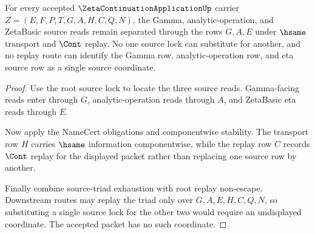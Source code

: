 \begin{theorem}
\label{thm:zeta-continuation-application-source-lock-triad-separation}
For every accepted $\ZetaContinuationApplicationUp$ carrier
$Z=(E,F,P,T,G,A,H,C,Q,N)$, the Gamma, analytic-operation, and ZetaBasic source
reads remain separated through the rows $G,A,E$ under $\hsame$ transport and
$\Cont$ replay. No one source lock can substitute for another, and no replay
route can identify the Gamma row, analytic-operation row, and eta source row as
a single source coordinate.
\end{theorem}
\begin{proof}
Use the root source lock to locate the three source reads. Gamma-facing reads
enter through $G$, analytic-operation reads through $A$, and ZetaBasic eta
reads through $E$.

Now apply the NameCert obligations and componentwise stability. The transport
row $H$ carries $\hsame$ information componentwise, while the replay row $C$
records $\Cont$ replay for the displayed packet rather than replacing one
source row by another.

Finally combine source-triad exhaustion with root replay non-escape. Downstream
routes may replay the triad only over $G,A,E,H,C,Q,N$, so substituting a single
source lock for the other two would require an undisplayed coordinate. The
accepted packet has no such coordinate.
\end{proof}

